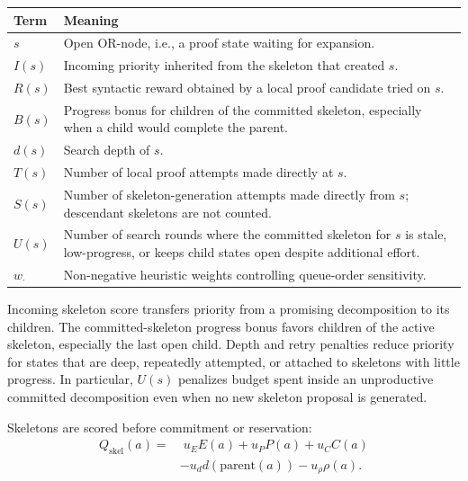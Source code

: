 \begin{center}
\small
\renewcommand{\arraystretch}{1.18}
\begin{tabular}{@{}p{}p{}@{}}
\toprule
Term & Meaning \\
\midrule
\(s\) & Open OR-node, i.e., a proof state waiting for expansion. \\
\(I(s)\) & Incoming priority inherited from the skeleton that created \(s\). \\
\(R(s)\) & Best syntactic reward obtained by a local proof candidate tried on \(s\). \\
\(B(s)\) & Progress bonus for children of the committed skeleton, especially when a child would complete the parent. \\
\(d(s)\) & Search depth of \(s\). \\
\(T(s)\) & Number of local proof attempts made directly at \(s\). \\
\(S(s)\) & Number of skeleton-generation attempts made directly from \(s\); descendant skeletons are not counted. \\
\(U(s)\) & Number of search rounds where the committed skeleton for \(s\) is stale, low-progress, or keeps child states open despite additional effort. \\
\(w_\cdot\) & Non-negative heuristic weights controlling queue-order sensitivity. \\
\bottomrule
\end{tabular}
\end{center}

Incoming skeleton score transfers priority from a promising decomposition to its children. The
committed-skeleton progress bonus favors children of the active skeleton, especially the last open child.
Depth and retry penalties reduce priority for states that are deep, repeatedly attempted, or attached to
skeletons with little progress. In particular, \(U(s)\) penalizes budget spent
inside an unproductive committed decomposition even when no new skeleton proposal is generated.

Skeletons are scored before commitment or reservation:
\[
\begin{aligned}
Q_{\mathrm{skel}}(a) =
&\; u_E E(a)
+ u_P P(a)
+ u_C C(a) \\
&- u_d d(\mathrm{parent}(a))
- u_\rho \rho(a).
\end{aligned}
\]

